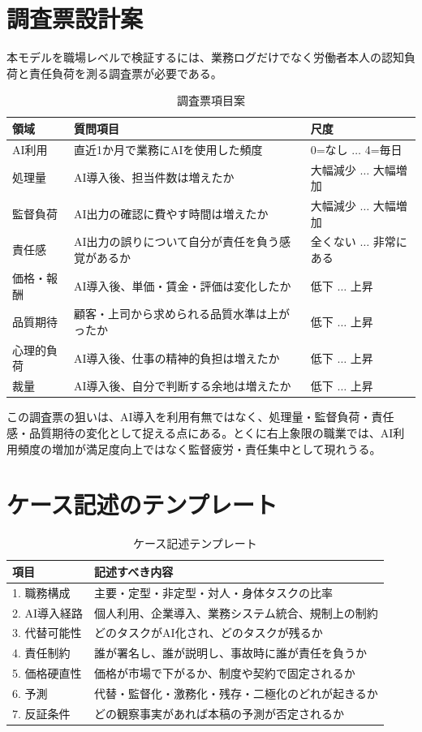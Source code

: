 \documentclass[11pt]{article}
\theoremstyle{plain}
\theoremstyle{definition}
\theoremstyle{remark}
\begin{document}
\section{調査票設計案}
本モデルを職場レベルで検証するには、業務ログだけでなく労働者本人の認知負荷と責任負荷を測る調査票が必要である。

\begin{table}[h]\centering\small
\caption{調査票項目案}\label{tab:survey}
\begin{tabularx}{\textwidth}{@{}lXl@{}}\toprule
領域 & 質問項目 & 尺度 \\ \midrule
AI利用 & 直近1か月で業務にAIを使用した頻度 & 0=なし $\dots$ 4=毎日 \\
処理量 & AI導入後、担当件数は増えたか & 大幅減少 $\dots$ 大幅増加 \\
監督負荷 & AI出力の確認に費やす時間は増えたか & 大幅減少 $\dots$ 大幅増加 \\
責任感 & AI出力の誤りについて自分が責任を負う感覚があるか & 全くない $\dots$ 非常にある \\
価格・報酬 & AI導入後、単価・賃金・評価は変化したか & 低下 $\dots$ 上昇 \\
品質期待 & 顧客・上司から求められる品質水準は上がったか & 低下 $\dots$ 上昇 \\
心理的負荷 & AI導入後、仕事の精神的負担は増えたか & 低下 $\dots$ 上昇 \\
裁量 & AI導入後、自分で判断する余地は増えたか & 低下 $\dots$ 上昇 \\
\bottomrule\end{tabularx}
\end{table}

\noindent この調査票の狙いは、AI導入を利用有無ではなく、処理量・監督負荷・責任感・品質期待の変化として捉える点にある。とくに右上象限の職業では、AI利用頻度の増加が満足度向上ではなく監督疲労・責任集中として現れうる。

\section{ケース記述のテンプレート}
\begin{table}[h]\centering\small
\caption{ケース記述テンプレート}\label{tab:case}
\begin{tabularx}{\textwidth}{@{}lX@{}}\toprule
項目 & 記述すべき内容 \\ \midrule
1. 職務構成 & 主要・定型・非定型・対人・身体タスクの比率 \\
2. AI導入経路 & 個人利用、企業導入、業務システム統合、規制上の制約 \\
3. 代替可能性 & どのタスクがAI化され、どのタスクが残るか \\
4. 責任制約 & 誰が署名し、誰が説明し、事故時に誰が責任を負うか \\
5. 価格硬直性 & 価格が市場で下がるか、制度や契約で固定されるか \\
6. 予測 & 代替・監督化・激務化・残存・二極化のどれが起きるか \\
7. 反証条件 & どの観察事実があれば本稿の予測が否定されるか \\
\bottomrule\end{tabularx}
\end{table}
\end{document}
